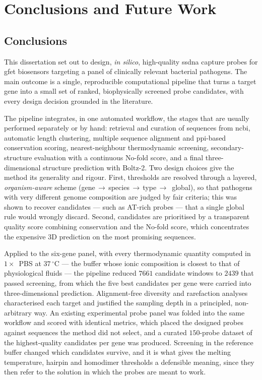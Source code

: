 \chapter{Conclusions and Future Work}

\section{Conclusions}

This dissertation set out to design, \emph{in silico}, high-quality \acrshort{ssdna} capture
probes for \acrshort{gfet} biosensors targeting a panel of clinically relevant bacterial
pathogens. The main outcome is a single, reproducible computational pipeline that turns a
target gene into a small set of ranked, biophysically screened probe candidates, with every
design decision grounded in the literature.

The pipeline integrates, in one automated workflow, the stages that are usually performed
separately or by hand: retrieval and curation of sequences from \acrshort{ncbi}, automatic
length clustering, multiple sequence alignment and \acrshort{ppi}-based conservation scoring,
nearest-neighbour thermodynamic screening, secondary-structure evaluation with a continuous
No-fold score, and a final three-dimensional structure prediction with Boltz-2. Two design choices give
the method its generality and rigour. First, thresholds are resolved through a layered,
\emph{organism-aware} scheme (gene\,$\rightarrow$\,species\,$\rightarrow$\,type\,$\rightarrow$\,
global), so that pathogens with very different genome composition are judged by fair criteria;
this was shown to recover candidates --- such as AT-rich probes --- that a single global rule
would wrongly discard. Second, candidates are prioritised by a transparent quality score
combining conservation and the No-fold score, which concentrates the expensive 3D prediction on
the most promising sequences.

Applied to the six-gene panel, with every thermodynamic quantity computed in $1\times$~PBS at
$37\,^{\circ}$C --- the buffer whose ionic composition is closest to that of physiological fluids ---
the pipeline reduced $7661$ candidate windows to $2439$ that passed screening, from which the five
best candidates per gene were carried into three-dimensional prediction. Alignment-free diversity and
rarefaction analyses characterised each target and justified the sampling depth in a principled,
non-arbitrary way. An existing experimental probe panel was folded into the same workflow and scored
with identical metrics, which placed the designed probes against sequences the method did not
select, and a curated $150$-probe dataset of the highest-quality candidates per gene was
produced. Screening in the reference buffer changed which
candidates survive, and it is what gives the melting temperature, hairpin and homodimer thresholds
a defensible meaning, since they then refer to the solution in which the probes are meant to
work.

